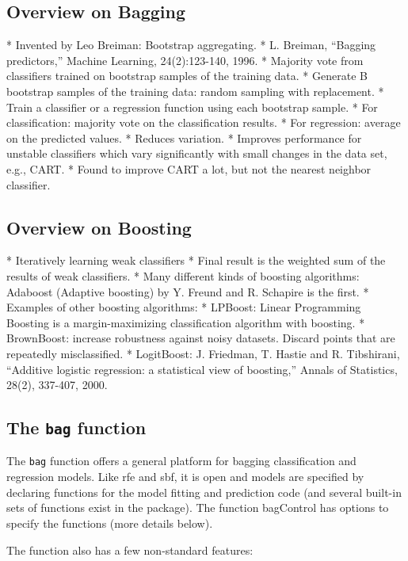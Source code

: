 \documentclass[caret-main.tex]{subfiles}
\begin{document}
\subsection{Overview on Bagging}

* Invented by Leo Breiman: Bootstrap aggregating.
* L. Breiman, “Bagging predictors,” Machine Learning,
24(2):123-140, 1996.
* Majority vote from classiﬁers trained on bootstrap samples of
the training data.
* Generate B bootstrap samples of the training data: random
sampling with replacement.
* Train a classiﬁer or a regression function using each bootstrap
sample.
* For classiﬁcation: majority vote on the classiﬁcation results.
* For regression: average on the predicted values.
* Reduces variation.
* Improves performance for unstable classiﬁers which vary signiﬁcantly with small changes in the data set, e.g., CART.
* Found to improve CART a lot, but not the nearest neighbor classifier.

\subsection{Overview on Boosting}

* Iteratively learning weak classiﬁers
*  Final result is the weighted sum of the results of weak
classiﬁers.
*  Many diﬀerent kinds of boosting algorithms: Adaboost
(Adaptive boosting) by Y. Freund and R. Schapire is the first.
*  Examples of other boosting algorithms:
*  LPBoost: Linear Programming Boosting is a
margin-maximizing classiﬁcation algorithm with boosting.
*  BrownBoost: increase robustness against noisy datasets.
Discard points that are repeatedly misclassiﬁed.
*  LogitBoost: J. Friedman, T. Hastie and R. Tibshirani,
“Additive logistic regression: a statistical view of boosting,”
Annals of Statistics, 28(2), 337-407, 2000.



\subsection{The \texttt{bag} function}

The \texttt{bag} function offers a general platform for bagging classification and regression models. Like rfe and sbf, it is open and models are specified by declaring functions for the model fitting and prediction code (and several built-in sets of functions exist in the package). The function bagControl has options to specify the functions (more details below).

The function also has a few non-standard features:
\end{document}
